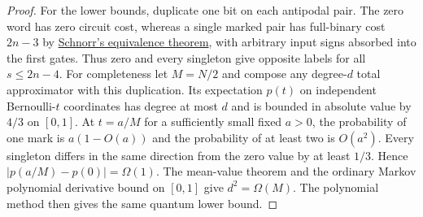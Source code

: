 \begin{proof}
For the lower bounds, duplicate one bit on each antipodal pair. The zero word has zero circuit cost, whereas a single marked pair has full-binary cost $2n-3$ by \href{https://doi.org/10.1016/0304-3975(76)90073-6}{Schnorr's equivalence theorem}, with arbitrary input signs absorbed into the first gates. Thus zero and every singleton give opposite labels for all $s\le 2n-4$. For completeness let $M=N/2$ and compose any degree-$d$ total approximator with this duplication. Its expectation $p(t)$ on independent Bernoulli-$t$ coordinates has degree at most $d$ and is bounded in absolute value by $4/3$ on $[0,1]$. At $t=a/M$ for a sufficiently small fixed $a>0$, the probability of one mark is $a(1-O(a))$ and the probability of at least two is $O(a^2)$. Every singleton differs in the same direction from the zero value by at least $1/3$. Hence $|p(a/M)-p(0)|=\Omega(1)$. The mean-value theorem and the ordinary Markov polynomial derivative bound on $[0,1]$ give $d^2=\Omega(M)$. The polynomial method then gives the same quantum lower bound.
\end{proof}

